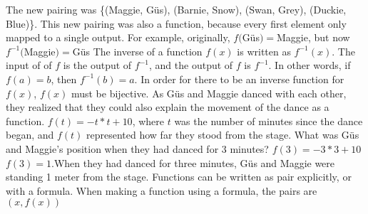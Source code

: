 {The new pairing was \{(Maggie, Güs), (Barnie, Snow), (Swan, Grey), (Duckie, Blue)\}. This new pairing was also a function, because every first element only mapped to a single output. For example, originally, $f($Güs$)= $Maggie, but now $f^{-1}($Maggie$) = $Güs}
{The inverse of a function $f(x)$ is written as $f^{-1}(x)$. The input of of $f$ is the output of $f^{-1}$, and the output of $f$ is $f^{-1}$. In other words, if $f(a)=b$, then $f^{-1}(b) = a$. In order for there to be an inverse function for $f(x)$, $f(x)$ must be bijective. }
{}
{As Güs and Maggie danced with each other, they realized that they could also explain the movement of the dance as a function. $f(t) = -t\ast t+10$, where $t$ was the number of minutes since the dance began, and $f(t)$ represented how far they stood from the stage. What was Güs and Maggie's position when they had danced for 3 minutes?}
{$f(3) = -3\ast 3 + 10$\linebreak $f(3)=1$.\linebreak When they had danced for three minutes, Güs and Maggie were standing 1 meter from the stage.}
{Functions can be written as pair explicitly, or with a formula. When making a function using a formula, the pairs are $(x, f(x))$}
{}
